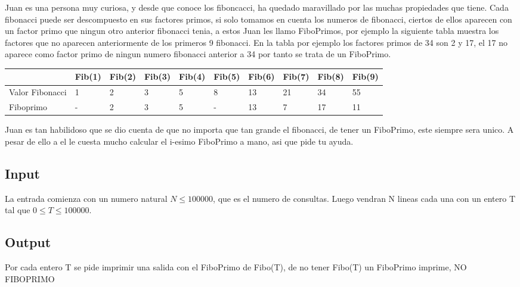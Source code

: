 
Juan es una persona muy curiosa, y desde que conoce los fiboncacci, ha quedado maravillado por las muchas propiedades que tiene. Cada fibonacci puede ser descompuesto en sus factores primos, si solo tomamos en cuenta los numeros de fibonacci, ciertos de ellos aparecen con un factor primo que ningun otro anterior fibonacci tenia, a estos Juan les llamo FiboPrimos, por ejemplo la siguiente tabla muestra los factores que no aparecen anteriormente de los primeros 9 fibonacci.
En la tabla por ejemplo los factores primos de 34 son 2 y 17, el 17 no aparece como factor primo de ningun numero fibonacci anterior a 34 por tanto se trata de un FiboPrimo.

\begin{center}
    \begin{tabular}{ | l | l | l | l | l | l | l | l | l | l | }
    \hline
     & Fib(1) & Fib(2) & Fib(3) & Fib(4) & Fib(5) & Fib(6) & Fib(7) & Fib(8) & Fib(9) \\ \hline
    Valor Fibonacci & 1 & 2 & 3 & 5 & 8 & 13 & 21 & 34 & 55 \\ \hline
    Fiboprimo & - & 2 & 3 & 5 & - & 13 & 7 & 17 & 11 \\ \hline
    \end{tabular}
\end{center}

Juan es tan habilidoso que se dio cuenta de que no importa que tan grande el fibonacci, de tener un FiboPrimo, este siempre sera unico. A pesar de ello a el le cuesta mucho calcular el    i-esimo FiboPrimo a mano, asi que pide tu ayuda.

\subsection*{Input}

La entrada comienza con un numero natural $N \leq 100000$, que es el numero de consultas. Luego vendran N lineas cada una con un entero T tal que $0 \leq T \leq 100000$.

\subsection*{Output}

Por cada entero T se pide imprimir una salida con el FiboPrimo de Fibo(T), de  no tener Fibo(T) un FiboPrimo imprime, NO FIBOPRIMO

\datos
